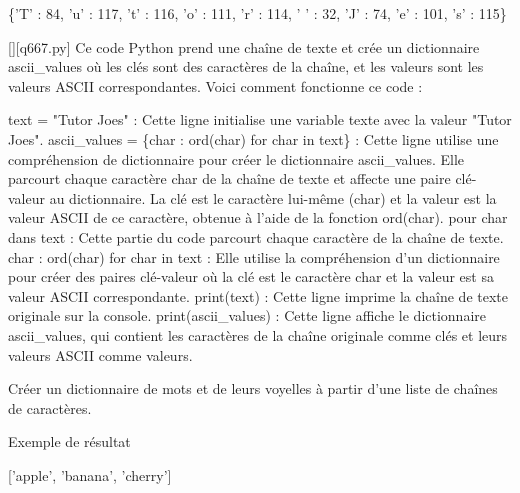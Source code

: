 \{'T' : 84, 'u' : 117, 't' : 116, 'o' : 111, 'r' : 114, ' ' : 32, 'J' : 74, 'e' : 101, 's' : 115\}
        \par
        \begin{solution}
            \renewcommand{\nomfichier}{q667.py}
            \pythonfile{\chemincode \nomfichier}[][\nomfichier]
            Ce code Python prend une chaîne de texte et crée un dictionnaire ascii\_values où les clés sont des caractères de la chaîne, et les valeurs sont les valeurs ASCII correspondantes. Voici comment fonctionne ce code :

    text = "Tutor Joes" : Cette ligne initialise une variable texte avec la valeur "Tutor Joes".
    ascii\_values = \{char : ord(char) for char in text\} : Cette ligne utilise une compréhension de dictionnaire pour créer le dictionnaire ascii\_values. Elle parcourt chaque caractère char de la chaîne de texte et affecte une paire clé-valeur au dictionnaire. La clé est le caractère lui-même (char) et la valeur est la valeur ASCII de ce caractère, obtenue à l'aide de la fonction ord(char).
        pour char dans text : Cette partie du code parcourt chaque caractère de la chaîne de texte.
        {char : ord(char) for char in text} : Elle utilise la compréhension d'un dictionnaire pour créer des paires clé-valeur où la clé est le caractère char et la valeur est sa valeur ASCII correspondante.
    print(text) : Cette ligne imprime la chaîne de texte originale sur la console.
    print(ascii\_values) : Cette ligne affiche le dictionnaire ascii\_values, qui contient les caractères de la chaîne originale comme clés et leurs valeurs ASCII comme valeurs.
        \end{solution}
        

        \question
        Créer un dictionnaire de mots et de leurs voyelles à partir d'une liste de chaînes de caractères.

Exemple de résultat

['apple', 'banana', 'cherry']

